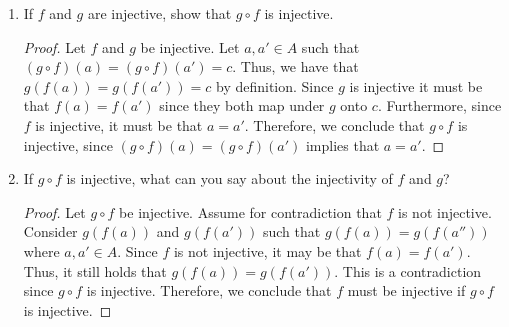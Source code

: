 \documentclass[12pt]{article}
\begin{document}
\begin{enumerate}[label=(\alph*)]
\begin{proof}
		Let $a \in f^{-1}(g^{-1}(C_0))$. By definition, it must be that $f(a) \in g^{-1}(C_0)$.
		Furthermore, note $g(f(a)) \in C_0$. Thus, $(g \circ f)(a) \in C_0$. As such,
		we have that ${a \in (g \circ f)^{-1}(C_0)}$. Therefore, 
		$f^{-1}(g^{-1}(C_0)) \subseteq (g \circ f)^{-1}(C_0)$. Hence, we have shown that 
		our claim holds in the case both sets are non-empty, i.e., 
		${(g \circ f)^{-1}(C_0) = f^{-1}(g^{-1}(C_0))}$.
	\end{proof}
	\item If $f$ and $g$ are injective, show that $g \circ f$ is injective.
	\begin{proof}
		Let $f$ and $g$ be injective. Let $a, a' \in A$ such that 
		$(g \circ f)(a) = (g \circ f)(a') = c$. Thus, we have that 
		$g(f(a)) = g(f(a')) = c$ by definition. Since $g$ is injective
		it must be that $f(a) = f(a')$ since they both map under $g$ onto $c$.
		Furthermore, since $f$ is injective, it must be that $a = a'$.
		Therefore, we conclude that $g \circ f$ is injective, since 
		$(g \circ f)(a) = (g \circ f)(a')$ implies that $a = a'$.
	\end{proof}
	\pagebreak
	\item If $g \circ f$ is injective, what can you say about the injectivity of 
	$f$ and $g$?
	\begin{proof}
		Let $g \circ f$ be injective. Assume for contradiction that $f$ is not injective.
		Consider $g(f(a))$ and $g(f(a'))$ such that $g(f(a)) = g(f(a''))$ where 
		$a, a' \in A$. Since $f$ is not injective, it may be that 
		$f(a) = f(a')$. Thus, it still holds that $g(f(a)) = g(f(a'))$. This is a 
		contradiction since $g \circ f$ is injective. Therefore, we conclude that 
		$f$ must be injective if $g \circ f$ is injective.
		

\end{proof}
\end{enumerate}
\end{document}
